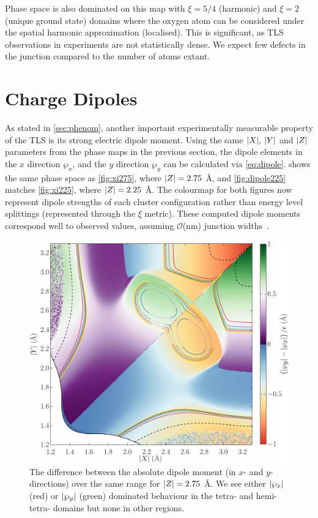 Phase space is also dominated on this map with $\xi=5/4$ (harmonic) and $\xi=2$ (unique ground state) domains where the oxygen atom can be considered under the spatial harmonic approximation (\ie localised).
This is significant, as TLS observations in experiments are not statistically dense.
We expect few defects in the junction compared to the number of atoms extant.

\section{Charge Dipoles}\label{sec:dipole}

As stated in \cref{sec:phenom}, another important experimentally measurable property of the TLS is its strong electric dipole moment.
Using the same $\lvert X\rvert, \: \lvert Y\rvert$ and $\lvert Z\rvert$ parameters from the phase maps in the previous section, the dipole elements in the $x$ direction $\wp_x$, and the $y$ direction $\wp_y$ can be calculated via \cref{eq:dipole}.
 shows the same phase space as \cref{fig:xi275}, where $\abs{Z} = 2.75$ \AA, and \cref{fig:dipole225} matches \cref{fig:xi225}, where $\lvert Z\rvert = 2.25$ \AA.
The colourmap for both figures now represent dipole strengths of each cluster configuration rather than energy level splittings (represented through the $\xi$ metric).
These computed dipole moments correspond well to observed values, assuming $\mathcal{O}$(nm) junction widths~\cite{Martinis2005, Cole2010}.

\begin{figure}[htp]
  \includegraphics[width=\textwidth]{figures/dipole275}
  \caption[Dipole Phase Map, With $\abs{Z} = 2.75$ \AA]{\label{fig:dipole275}The difference between the absolute dipole moment (in $x$- and $y$-directions) over the same range for $\abs{Z} = 2.75$ \AA. We see either $\lvert\wp_x\rvert$ (red) or $\lvert\wp_y\rvert$ (green) dominated behaviour in the tetra- and hemi-tetra- domains but none in other regions.}
\end{figure}

